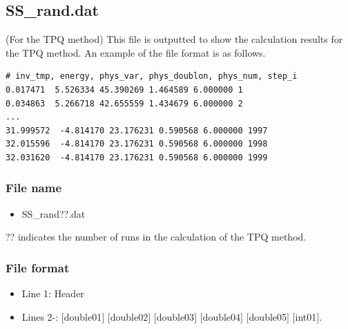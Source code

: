 \newpage
\subsection{SS\_rand.dat}
\label{Subsec:ssrand}
(For the TPQ method) This file is outputted to show the calculation results for the TPQ method.
An example of the file format is as follows.\\
\begin{minipage}{15cm}
\begin{screen}
\begin{verbatim}
# inv_tmp, energy, phys_var, phys_doublon, phys_num, step_i
0.017471  5.526334 45.390269 1.464589 6.000000 1
0.034863  5.266718 42.655559 1.434679 6.000000 2
...
31.999572  -4.814170 23.176231 0.590568 6.000000 1997
32.015596  -4.814170 23.176231 0.590568 6.000000 1998
32.031620  -4.814170 23.176231 0.590568 6.000000 1999
\end{verbatim}
\end{screen}
\end{minipage}

\subsubsection{File name}
 \begin{itemize}
   \item SS\_rand??.dat
  \end{itemize}
  ?? indicates the number of runs in the calculation of the TPQ method.

\subsubsection{File format}
\begin{itemize}
   \item Line 1: Header
   \item Lines 2-: $[$double01$]$ $[$double02$]$ $[$double03$]$ $[$double04$]$ $[$double05$]$ $[$int01$]$.
  \end{itemize}
